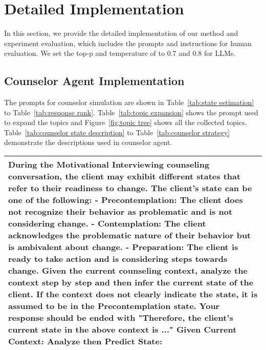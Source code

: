 \section{Detailed Implementation}
\label{app:implementation}

In this section, we provide the detailed implementation of our method and experiment evaluation, which includes the prompts and instructions for human evaluation. We set the top-p and temperature of to 0.7 and 0.8 for LLMs.

\subsection{Counselor Agent Implementation}
\label{app:counselor implementation}

The prompts for counselor simulation are shown in Table~\ref{tab:state estimation} to Table~\ref{tab:response rank}. Table~\ref{tab:topic expansion} shows the prompt used to expand the topics and Figure~\ref{fig:topic tree} shows all the collected topics. Table~\ref{tab:counselor state description} to Table~\ref{tab:counselor strategy} demonstrate the descriptions used in counselor agent.

\begin{table*}[tb]
\begin{tabularx}{\textwidth}{X}
\toprule
{\sf \footnotesize During the Motivational Interviewing counseling conversation, the client may exhibit different states that refer to their readiness to change. The client's state can be one of the following: \newline \newline - Precontemplation: The client does not recognize their behavior as problematic and is not considering change. \newline - Contemplation: The client acknowledges the problematic nature of their behavior but is ambivalent about change. \newline - Preparation: The client is ready to take action and is considering steps towards change. \newline \newline Given the current counseling context, analyze the context step by step and then infer the current state of the client. If the context does not clearly indicate the state, it is assumed to be in the Precontemplation state. \newline Your response should be ended with "Therefore, the client's current state in the above context is ..." \newline \newline Given Current Context: \newline [context]  \newline \newline Analyze then Predict State:}
\\ \bottomrule
\end{tabularx}
\caption{Prompt for the counselor agent to infer the state of client. The [context] will be replaced by the conversation so far.}
\label{tab:state estimation}
\end{table*}

